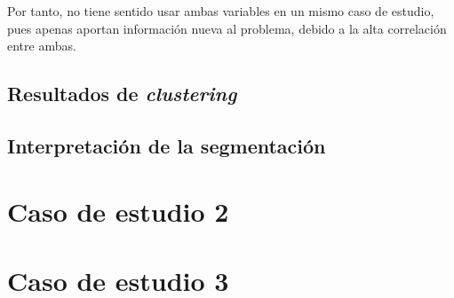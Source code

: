 \documentclass[11pt]{article}
\begin{document}
Por tanto, no tiene sentido usar ambas variables en un mismo caso de estudio, pues apenas aportan información nueva al problema, debido a la alta correlación entre ambas.


\subsection{Resultados de \emph{clustering}}

\subsection{Interpretación de la segmentación}


\pagebreak

\section{Caso de estudio 2}

\pagebreak

\section{Caso de estudio 3}

\pagebreak



\end{document}
